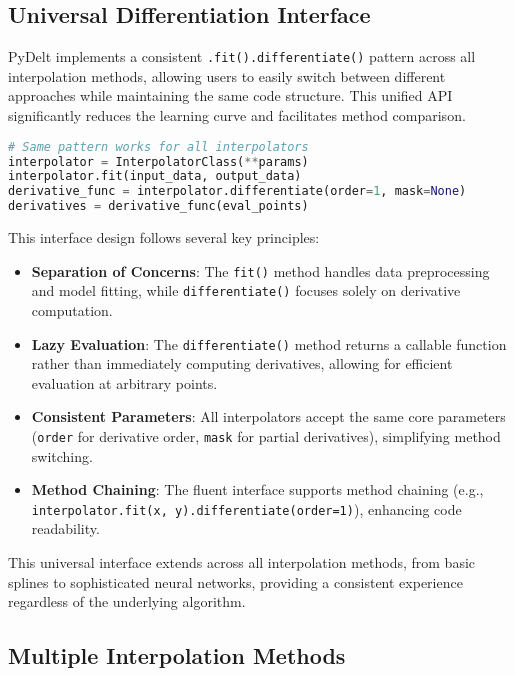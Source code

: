 \documentclass[11pt,a4paper]{article}
\begin{document}
\subsection{Universal Differentiation Interface}

PyDelt implements a consistent \texttt{.fit().differentiate()} pattern across all interpolation methods, allowing users to easily switch between different approaches while maintaining the same code structure. This unified API significantly reduces the learning curve and facilitates method comparison.

\begin{lstlisting}[language=Python, caption=Universal differentiation interface example]
# Same pattern works for all interpolators
interpolator = InterpolatorClass(**params)
interpolator.fit(input_data, output_data)
derivative_func = interpolator.differentiate(order=1, mask=None)
derivatives = derivative_func(eval_points)
\end{lstlisting}

This interface design follows several key principles:

\begin{itemize}
    \item \textbf{Separation of Concerns}: The \texttt{fit()} method handles data preprocessing and model fitting, while \texttt{differentiate()} focuses solely on derivative computation.
    
    \item \textbf{Lazy Evaluation}: The \texttt{differentiate()} method returns a callable function rather than immediately computing derivatives, allowing for efficient evaluation at arbitrary points.
    
    \item \textbf{Consistent Parameters}: All interpolators accept the same core parameters (\texttt{order} for derivative order, \texttt{mask} for partial derivatives), simplifying method switching.
    
    \item \textbf{Method Chaining}: The fluent interface supports method chaining (e.g., \texttt{interpolator.fit(x, y).differentiate(order=1)}), enhancing code readability.
\end{itemize}

This universal interface extends across all interpolation methods, from basic splines to sophisticated neural networks, providing a consistent experience regardless of the underlying algorithm.

\subsection{Multiple Interpolation Methods}
\end{document}
